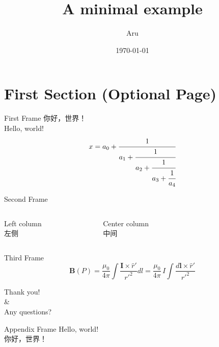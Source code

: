 \documentclass{presentation}
\title{A minimal example}
\date{\today}
\author{Aru}
\institute{Astronomy Dept., Xiamen Univ.}
\begin{document}
\maketitle
\section{First Section (Optional Page)}
\begin{frame}{First Frame}
	你好，世界！  \\
	Hello, world! \\
	\begin{equation}
		x = a_0 + \cfrac{1}{a_1 
			+ \cfrac{1}{a_2 
				+ \cfrac{1}{a_3 + \cfrac{1}{a_4} } } }
	\end{equation}
\end{frame}

\begin{frame}{Second Frame}
	\begin{columns}
		\begin{column}{0.33\textwidth}
			Left column \\
			左侧
		\end{column}
		\begin{column}{0.33\textwidth}
			\centering
			Center column \\
			中间
		\end{column}
		\begin{column}{0.33\textwidth}
			 \\
		\end{column}
	\end{columns}
\end{frame}

\begin{frame}{Third Frame}
	\begin{equation}
		\mathbf{B}(P) = \frac{\mu_0}{4\pi}
		\int\frac{\mathbf{I}\times\hat{r}'}{r'^2}dl = \frac{\mu_0}{4\pi}\,I\!
		\int\frac{d\boldsymbol{l}\times\hat{r}'}{r'^2}
	\end{equation}
\end{frame}

\begin{frame}[standout]
	Thank you! \\
	\& \\
	Any questions? 
\end{frame}

\appendix
\begin{frame}{Appendix Frame}
	Hello, world!  \\
	你好，世界！
\end{frame}
\end{document}
